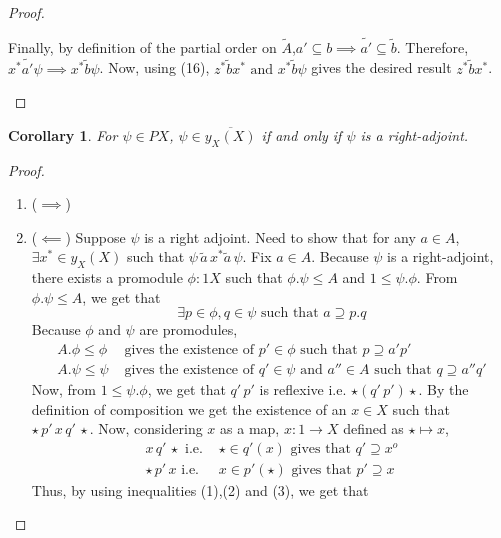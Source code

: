 \documentclass[18pt,a4paper]{article}
\makeatletter
\newtheorem{coro}{Corollary}[section]
\theoremstyle{definition}
\newcommand{\carrow}{}%
\DeclareRobustCommand{\carrow}{%
	\mathrel{\vphantom{\rightarrow}\mathpalette\circle@arrow\relax}%
}
\newcommand{\circle@arrow}[2]{%
	\m@th
	\ooalign{%
		\hidewidth$#1\circ\mkern1mu$\hidewidth\cr
	$#1\longrightarrow$\cr}%
}
\makeatother
\begin{document}
\begin{proof}
\begin{enumerate}[label=(\alph*)]
				Finally, by definition of the partial order on $\tilde{A}$,$a' \subseteq b \implies \tilde{a'}
				\subseteq \tilde{b} $. Therefore,  $x^* \tilde{a'}\psi \implies x^* \tilde{b}\psi$.
				Now, using (16), $z^* \tilde{b}x^* \text{ and } x^*\tilde{b}\psi  $ gives the desired result
				$z^* \tilde{b} x^* $.
		\end{enumerate}
	\end{proof}
	\begin{coro}
		For $\psi \in PX$, $\psi \in \overline{y_X(X)}$ if and only if $\psi$ is a right-adjoint.
	\end{coro}
	\begin{proof}
		\setcounter{equation}{0}
		\begin{enumerate}[label=(\roman*)]
			\item ($\implies$)
			\item ($\impliedby$) Suppose $\psi$ is a right adjoint. Need to show that for any
				$a \in A$, $\exists x^* \in y_X(X)$ such that $\psi \, \tilde{a} \,x^*
				\tilde{a} \, \psi$. Fix $a \in A$. Because $\psi$ is a right-adjoint, there
				exists a promodule $\phi: 1 \carrow X$ such that $\phi.\psi \leq A$ and
				$1\leq \psi.\phi$. From $\phi.\psi \leq A$, we get that
				\begin{equation}\exists p \in \phi, q \in \psi \text{ such that }
					a \supseteq p.q
				\end{equation}
				Because $\phi$ and $\psi$ are promodules,
				\begin{align}
					A.\phi \leq \phi & \text{ gives the existence of } p' \in \phi \text{ such that } p\supseteq a'p'  \\
					A.\psi \leq \psi & \text{ gives the existence of } q' \in \psi \text{ and } a'' \in A
					\text{ such that } q \supseteq a''q'
				\end{align}
				Now, from $1 \leq \psi.\phi$, we get that $q'\,p'$ is reflexive i.e. $\star (q' \,p')
				\star$. By the definition of composition we get the existence of an $x \in X$
				such that $\star \, p' \, x \,q'\,\star$. Now, considering $x$ as a map, $x:1 \to X$
				defined as $\star \mapsto x$,
				\begin{align}
					x \, q' \, \star \text{ i.e. } &\star \in q'(x) \text{ gives that }
					q' \supseteq x^o \\
					\star \,p' \, x \text{ i.e. } &x \in p'(\star) \text{ gives that }
					p'\supseteq x
				\end{align}
				Thus, by using inequalities (1),(2) and (3), we get that

\end{enumerate}
\end{proof}
\end{document}
